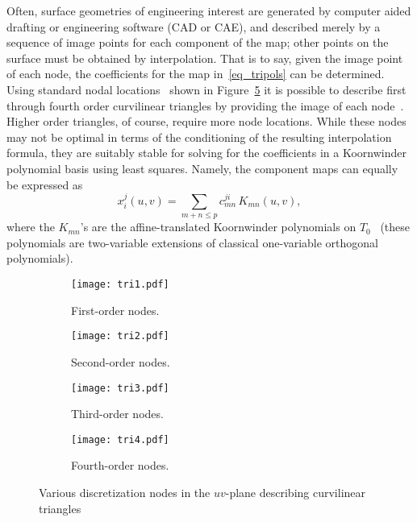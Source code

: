\documentclass[11pt]{article}
\numberwithin{equation}{section}
\begin{document}
Often, surface geometries of engineering interest are generated by
computer aided drafting or engineering software (CAD or CAE), and
described merely by a sequence of image points for each component of
the map; other points on the surface must be obtained by interpolation.
That is to say, given the image point of each node, the coefficients
for the map in~\eqref{eq_tripols} can be determined.
Using standard nodal locations~\cite{gmsh} shown in
Figure~\ref{fig_gmshnodes} it is possible to describe first through
fourth order curvilinear triangles by providing the image of each
node~\cite{gmsh}. Higher order triangles, of course, require more node
locations.
While these nodes may not be optimal in terms of the conditioning of
the resulting interpolation formula, they are suitably stable for
solving for the coefficients in a Koornwinder polynomial basis using
least squares. Namely, the component maps can equally
be expressed as
\begin{equation}
x_i^j(u,v) = \sum_{m+n \leq p} c^{ji}_{mn} \, K_{mn}(u,v),
\end{equation}
where the $K_{mn}$'s are the affine-translated Koornwinder polynomials on
$T_0$~\cite{bremer_2012c, koornwinder_1975} (these polynomials are
two-variable extensions of classical one-variable
orthogonal polynomials).



\begin{figure}[!t]
  \begin{subfigure}[b]{.22\linewidth}
    \centering
    \texttt{[image: tri1.pdf]}
    \caption{First-order nodes.}
    \label{fig_tri1}
  \end{subfigure}
  \begin{subfigure}[b]{.22\linewidth}
    \centering
    \texttt{[image: tri2.pdf]}
    \caption{Second-order nodes.}
    \label{fig_tri2}
  \end{subfigure}
  \begin{subfigure}[b]{.22\linewidth}
    \centering
    \texttt{[image: tri3.pdf]}
    \caption{Third-order nodes.}
    \label{fig_tri3}
  \end{subfigure}
  \begin{subfigure}[b]{.22\linewidth}
    \centering
    \texttt{[image: tri4.pdf]}
    \caption{Fourth-order nodes.}
    \label{fig_tri4}
  \end{subfigure}
  \caption{Various discretization nodes in the $uv$-plane describing
    curvilinear triangles}
  \label{fig_gmshnodes}
\end{figure}
\end{document}
